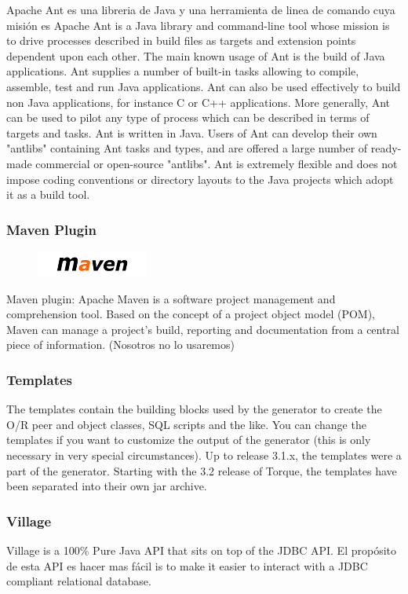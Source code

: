 \documentclass[12pt, oneside]{article}
\begin{document}
Apache Ant es una libreria de Java y una herramienta de linea de comando cuya misión es
Apache Ant is a Java library and command-line tool whose mission is to drive processes described in build files as targets and extension points dependent upon each other. The main known usage of Ant is the build of Java applications. Ant supplies a number of built-in tasks allowing to compile, assemble, test and run Java applications. Ant can also be used effectively to build non Java applications, for instance C or C++ applications. More generally, Ant can be used to pilot any type of process which can be described in terms of targets and tasks. Ant is written in Java. Users of Ant can develop their own "antlibs" containing Ant tasks and types, and are offered a large number of ready-made commercial or open-source "antlibs". Ant is extremely flexible and does not impose coding conventions or directory layouts to the Java projects which adopt it as a build tool.

\subsubsection{Maven Plugin}

\begin{figure}
	\includegraphics[scale=.8]{img/maven-logo.png}
\end{figure}

Maven plugin: Apache Maven is a software project management and comprehension tool. Based on the concept of a project object model (POM), Maven can manage a project's build, reporting and documentation from a central piece of information. (Nosotros no lo usaremos)

\subsubsection{Templates}
The templates contain the building blocks used by the generator to create the O/R peer and object classes, SQL scripts and the like. You can change the templates if you want to customize the output of the generator (this is only necessary in very special circumstances). Up to release 3.1.x, the templates were a part of the generator. Starting with the 3.2 release of Torque, the templates have been separated into their own jar archive.

\subsubsection{Village}
Village is a 100\% Pure Java API that sits on top of the JDBC API. El propósito de esta API es hacer mas fácil is to make it easier to interact with a JDBC compliant relational database.
\end{document}
